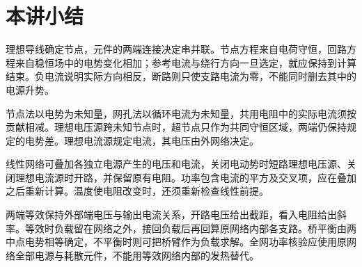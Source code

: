 \section{本讲小结}

理想导线确定节点，元件的两端连接决定串并联。节点方程来自电荷守恒，回路方程来自稳恒场中的电势变化相加；参考电流与绕行方向一旦选定，就应保持到计算结束。负电流说明实际方向相反，断路则只使支路电流为零，不能同时删去其中的电源升势。

节点法以电势为未知量，网孔法以循环电流为未知量，共用电阻中的实际电流须按贡献相减。理想电压源跨未知节点时，超节点只作为共同守恒区域，两端仍保持规定的电势差。理想电流源规定电流，其电压由外网络决定。

线性网络可叠加各独立电源产生的电压和电流，关闭电动势时短路理想电压源、关闭理想电流源时开路，并保留原有电阻。功率包含电流的平方及交叉项，应在叠加之后重新计算。温度使电阻改变时，还须重新检查线性前提。

两端等效保持外部端电压与输出电流关系，开路电压给出截距，看入电阻给出斜率。等效时负载留在网络之外，接回负载后再回算原网络内部各支路。桥平衡由两中点电势相等确定，不平衡时则可把桥臂作为负载求解。全网功率核验应使用原网络全部电源与耗散元件，不能用等效网络内部的发热替代。
